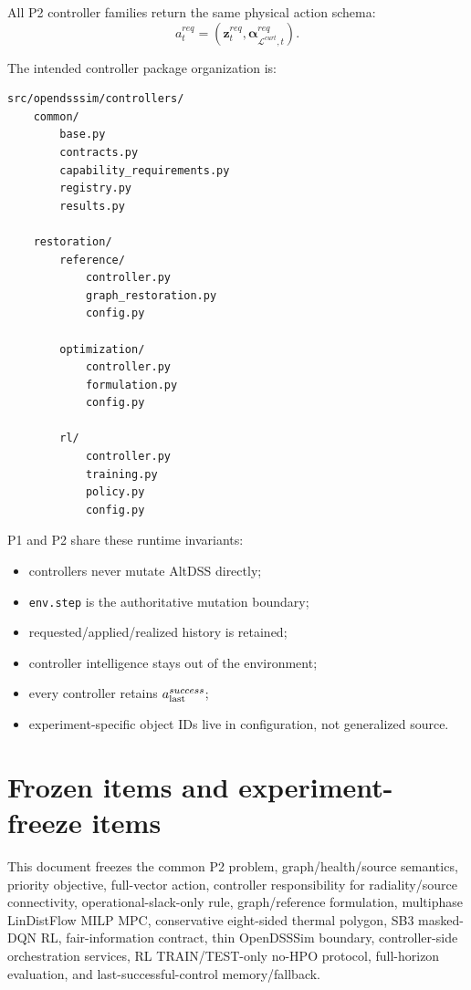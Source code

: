 \documentclass[11pt]{article}
\begin{document}
All P2 controller families return the same physical action schema:
\[
a_t^{req}
=
(\mathbf z_t^{req},\boldsymbol\alpha_{\mathcal L^{curt},t}^{req}).
\]

The intended controller package organization is:
\begin{verbatim}
src/opendsssim/controllers/
    common/
        base.py
        contracts.py
        capability_requirements.py
        registry.py
        results.py

    restoration/
        reference/
            controller.py
            graph_restoration.py
            config.py

        optimization/
            controller.py
            formulation.py
            config.py

        rl/
            controller.py
            training.py
            policy.py
            config.py
\end{verbatim}

P1 and P2 share these runtime invariants:
\begin{itemize}
\item controllers never mutate AltDSS directly;
\item \texttt{env.step} is the authoritative mutation boundary;
\item requested/applied/realized history is retained;
\item controller intelligence stays out of the environment;
\item every controller retains $a_{\rm last}^{success}$;
\item experiment-specific object IDs live in configuration, not generalized source.
\end{itemize}

\section{Frozen items and experiment-freeze items}
This document freezes the common P2 problem, graph/health/source semantics, priority
objective, full-vector action, controller responsibility for radiality/source connectivity,
operational-slack-only rule, graph/reference formulation, multiphase LinDistFlow MILP
MPC, conservative eight-sided thermal polygon, SB3 masked-DQN RL, fair-information
contract, thin OpenDSSSim boundary, controller-side orchestration services, RL
TRAIN/TEST-only no-HPO protocol, full-horizon evaluation, and last-successful-control memory/fallback.
\end{document}
